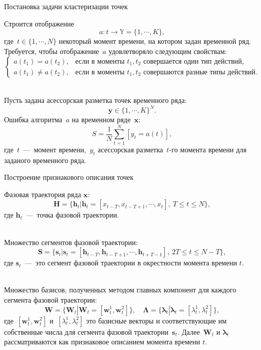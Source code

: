 \documentclass[10pt,pdf,hyperref={unicode}]{beamer}
\begin{document}
\begin{frame}[shrink=5]{Постановка задачи кластеризации точек}
\justifying

Строится отображение
$$
a : t \to \mathbb{Y} = \{1,\cdots, K\}, 
$$
где~$t \in \{1,\cdots, N\}$ некоторый момент времени, на котором задан временной ряд.
Требуется, чтобы отображение~$a$ удовлетворяло следующим свойствам:
$$
\begin{cases}
    a\left(t_1\right) = a\left(t_2\right), &  \text{если в моменты } t_1, t_2 \text{ совершается один тип действий},\\
    a\left(t_1\right) \not= a\left(t_2\right), &  \text{если в моменты } t_1, t_2 \text{ совершаются разные типы действий}.
\end{cases}
$$

~\\
Пусть задана асессорская разметка точек временного ряда:
$$
\textbf{y} \in \{1,\cdots,K\}^{N}.
$$
Ошибка алгоритма~$a$ на временном ряде~$\textbf{x}$:
$$
S = \frac{1}{N}\sum_{t=1}^{N}[y_t = a\left(t\right)],
$$
где~$t$~---~момент времени,~$y_t$ асессорская разметка~$t$-го момента времени для заданого временного ряда.

\end{frame}
\begin{frame}[shrink=5]{Построение признакового описания точек}
\justifying

Фазовая траектория ряда $\textbf{x}$:
$$\mathbf{H} = \{\textbf{h}_t| \textbf{h}_t = [x_{t-T}, x_{t-T+1}, \cdots, x_{t}],~T\leq t\leq N\},$$
где $\textbf{h}_t$~---~точка фазовой траектории.

~\\
Множество сегментов фазовой траектории:
$$\mathbf{S} = \{\textbf{s}_t| \textbf{s}_t = [\textbf{h}_{t-T}, \textbf{h}_{t-T+1}, \cdots, \textbf{h}_{t+T-1}],~2T\leq t\leq N-T\},$$
где $\textbf{s}_t$~---~это сегмент фазовой траектории в окрестности момента времени $t$.

~\\
Множество базисов, полученных методом главных компонент для каждого сегмента фазовой траектории:
$$\mathbf{W} = \{\textbf{W}_t| \textbf{W}_t = [\textbf{w}^1_t, \textbf{w}^2_t]\}, \quad \bm{\Lambda} = \{\bm{\lambda}_t| \bm{\lambda}_t=[\lambda^1_t, \lambda^2_t]\},$$
где~$[\textbf{w}^1_t, \textbf{w}^2_t]$ и~$[\lambda^1_t, \lambda^2_t]$ это базисные векторы и соответствующие им собственные числа для сегмента фазовой траектории~$\textbf{s}_t$. Далее~$\textbf{W}_t$  и $\bm{\lambda}_t$ рассматриваются как признаковое описанием момента времени $t$.
\end{frame}
\end{document}
